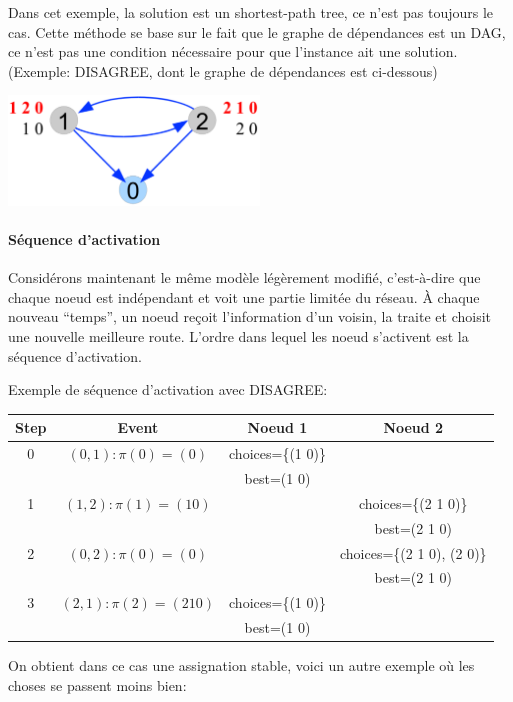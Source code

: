 \documentclass{article}
\begin{document}
\begin{sffamily}
Dans cet exemple, la solution est un shortest-path tree, ce n'est pas
toujours le cas. Cette méthode se base sur le fait que le graphe de
dépendances est un DAG, ce n'est pas une condition nécessaire pour que
l'instance ait une solution. (Exemple: DISAGREE, dont le graphe de
dépendances est ci-dessous)

\includegraphics[width=0.5\textwidth]{fab_018.pdf}

\paragraph{Séquence d'activation}

Considérons maintenant le même modèle légèrement modifié, c'est-à-dire
que chaque noeud est indépendant et voit une partie limitée du
réseau. À chaque nouveau ``temps'', un noeud reçoit l'information d'un
voisin, la traite et choisit une nouvelle meilleure route. L'ordre
dans lequel les noeud s'activent est la séquence d'activation.

Exemple de séquence d'activation avec DISAGREE:

\begin{tabular}{|c|c|c|c|}
  \hline
  Step & Event & Noeud 1 & Noeud 2 \\
  \hline
  0 & $(0, 1): \pi(0) = (0)$ & choices=\{(1 0)\} & \\
  & & best=(1 0) & \\
  \hline
  1 & $(1, 2): \pi(1) = (1 0)$ & & choices=\{(2 1 0)\} \\
  & & & best=(2 1 0) \\
  \hline
  2 & $(0, 2): \pi(0) = (0)$ & & choices=\{(2 1 0), (2 0)\} \\
  & & & best=(2 1 0) \\
  \hline
  3 & $(2, 1): \pi(2) = (2 1 0)$ & choices=\{(1 0)\} & \\
  & & best=(1 0) & \\
  \hline
\end{tabular}

On obtient dans ce cas une assignation stable, voici un autre exemple
où les choses se passent moins bien:


\end{sffamily}
\end{document}
